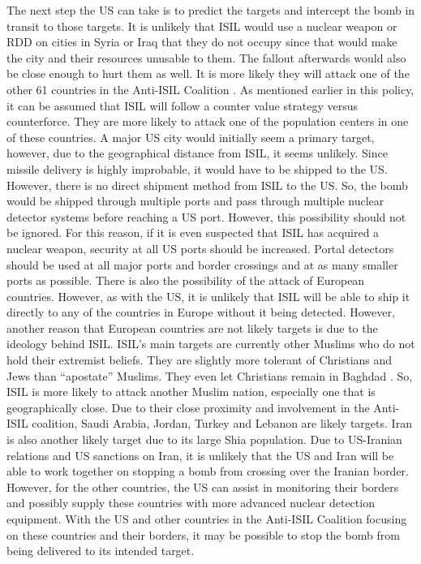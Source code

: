 \documentclass{report}
\begin{document}
The next step the US can take is to predict the targets and intercept the bomb in transit to those targets.  It is unlikely that ISIL would use a nuclear weapon or RDD on cities in Syria or Iraq that they do not occupy since that would make the city and their resources unusable to them.  The fallout afterwards would also be close enough to hurt them as well.  It is more likely they will attack one of the other 61 countries in the Anti-ISIL Coalition \cite{Wordsworth2015}.  As mentioned earlier in this policy, it can be assumed that ISIL will follow a counter value strategy versus counterforce.  They are more likely to attack one of the population centers in one of these countries.  A major US city would initially seem a primary target, however, due to the geographical distance from ISIL, it seems unlikely.  Since missile delivery is highly improbable, it would have to be shipped to the US.  However, there is no direct shipment method from ISIL to the US.  So, the bomb would be shipped through multiple ports and pass through multiple nuclear detector systems before reaching a US port.  However, this possibility should not be ignored.  For this reason, if it is even suspected that ISIL has acquired a nuclear weapon, security at all US ports should be increased.  Portal detectors should be used at all major ports and border crossings and at as many smaller ports as possible.  There is also the possibility of the attack of European countries.   However, as with the US, it is unlikely that ISIL will be able to ship it directly to any of the countries in Europe without it being detected.  However, another reason that European countries are not likely targets is due to the ideology behind ISIL.  ISIL’s main targets are currently other Muslims who do not hold their extremist beliefs.  They are slightly more tolerant of Christians and Jews than \enquote{apostate} Muslims.  They even let Christians remain in Baghdad \cite{Wood2015}.  So, ISIL is more likely to attack another Muslim nation, especially one that is geographically close.  Due to their close proximity and involvement in the Anti-ISIL coalition, Saudi Arabia, Jordan, Turkey and Lebanon are likely targets.  Iran is also another likely target due to its large Shia population.  Due to US-Iranian relations and US sanctions on Iran, it is unlikely that the US and Iran will be able to work together on stopping a bomb from crossing over the Iranian border.  However, for the other countries, the US can assist in monitoring their borders and possibly supply these countries with more advanced nuclear detection equipment.  With the US and other countries in the Anti-ISIL Coalition focusing on these countries and their borders, it may be possible to stop the bomb from being delivered to its intended target.
\end{document}
